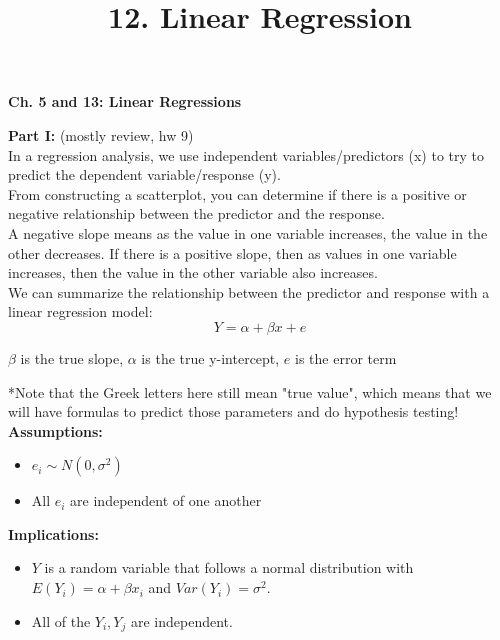 \documentclass[12pt]{article}
\title{12. Linear Regression}
\begin{document}
\begin{center} \textbf{Ch. 5 and 13: Linear Regressions}
\end{center}

\noindent \textbf{Part I:} (mostly review, hw 9)\\

In a regression analysis, we use independent variables/predictors (x) to try to predict the dependent variable/response (y). \\

From constructing a scatterplot, you can determine if there is a positive or negative relationship between the predictor and the response. \\

A negative slope means as the value in one variable increases, the value in the other decreases. If there is a positive slope, then as values in one variable increases, then the value in the other variable also increases.\\

We can summarize the relationship between the predictor and response with a linear regression model:\\
$$ Y = \alpha + \beta x + e $$

\begin{center}
    $\beta$ is the true slope, $\alpha$ is the true y-intercept, $e$ is the error term 
\end{center}

*Note that the Greek letters here still mean "true value", which means that we will have formulas to predict those parameters and do hypothesis testing!\\

\noindent \textbf{Assumptions:}
\begin{itemize}
\item $e_{i} \sim N(0,\sigma^{2})$
\item All $e_{i}$ are independent of one another\\
\end{itemize}

\noindent \textbf{Implications:}
\begin{itemize}
\item
$Y$ is a random variable that follows a normal distribution with $E(Y_{i})=\alpha + \beta x_{i}$ and $Var(Y_{i}) = \sigma^{2}$. 
\item
All of the $Y_{i}, Y_{j}$ are independent. 
\end{itemize}
\vspace{5mm}
\end{document}
